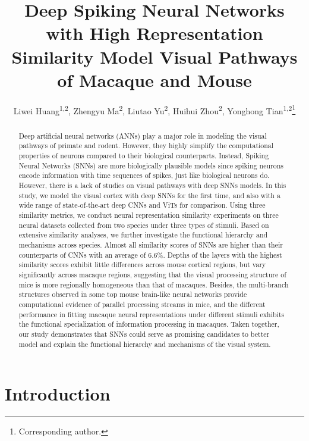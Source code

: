 \documentclass[letterpaper]{article} %
\title{Deep Spiking Neural Networks with High Representation Similarity Model Visual Pathways of Macaque and Mouse}
\author {
Liwei Huang\textsuperscript{\rm 1,\rm 2},
Zhengyu Ma\textsuperscript{\rm 2}\footnotemark[1],
Liutao Yu\textsuperscript{\rm 2},
Huihui Zhou\textsuperscript{\rm 2},
Yonghong Tian\textsuperscript{\rm 1,\rm 2}\thanks{Corresponding author.}
}
\begin{document}
\maketitle

\begin{abstract}
	Deep artificial neural networks (ANNs) play a major role in modeling the visual pathways of primate and rodent. However, they highly simplify the computational properties of neurons compared to their biological counterparts. Instead, Spiking Neural Networks (SNNs) are more biologically plausible models since spiking neurons encode information with time sequences of spikes, just like biological neurons do. However, there is a lack of studies on visual pathways with deep SNNs models. In this study, we model the visual cortex with deep SNNs for the first time, and also with a wide range of state-of-the-art deep CNNs and ViTs for comparison. Using three similarity metrics, we conduct neural representation similarity experiments on three neural datasets collected from two species under three types of stimuli. Based on extensive similarity analyses, we further investigate the functional hierarchy and mechanisms across species. Almost all similarity scores of SNNs are higher than their counterparts of CNNs with an average of $6.6\%$. Depths of the layers with the highest similarity scores exhibit little differences across mouse cortical regions, but vary significantly across macaque regions, suggesting that the visual processing structure of mice is more regionally homogeneous than that of macaques. Besides, the multi-branch structures observed in some top mouse brain-like neural networks provide computational evidence of parallel processing streams in mice, and the different performance in fitting macaque neural representations under different stimuli exhibits the functional specialization of information processing in macaques. Taken together, our study demonstrates that SNNs could serve as promising candidates to better model and explain the functional hierarchy and mechanisms of the visual system.
\end{abstract}

\section{Introduction}
\label{intro}
\end{document}
